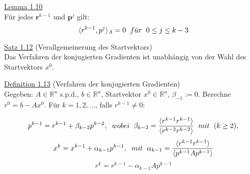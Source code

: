\documentclass[a4paper]{letter}
\begin{document}
\underline{Lemma 1.10}
\\F\"ur jedes $\textbf{r}^{k-1}$ und $\textbf{p}^{j}$ gilt:
$$\langle r^{k-1}, p^{j} \rangle _{A} = 0 \hspace{2mm} f\ddot{u}r \hspace{2mm} 0 \le j \le k-3$$

\underline{Satz 1.12} (Verallgemeinerung des Startvektors)
\\Das Verfahren der konjugierten Gradienten ist unabh\"angig von der Wahl des Startvektors $x^{0}$.

\underline{Definition 1.13} (Verfahren der konjugierten Gradienten)
\\Gegeben: $A \in \mathbb{R}^{n}$ s.p.d., $b \in \mathbb{R}^{n}$, Startvektor $x^{0} \in \mathbb{R}^{n}$, $\beta_{-1} := 0$. Berechne $r^{0} = b - Ax^{0}$. F\"ur $k = 1,2,...$, falls $r^{k-1} \ne 0$:
\begin{Large}
\emph{
	$$p^{k-1} = r^{k-1} + \beta_{k-2}p^{k-2}, \hspace{2mm} wobei \hspace{2mm} \beta_{k-2} = \frac {\langle r^{k-1} r^{k-1} \rangle} {\langle r^{k-2} r^{k-2} \rangle} \hspace{2mm} mit \hspace{2mm} (k \ge 2),$$
	$$x^{k} = x^{k-1} + \alpha_{k-1}p^{k-1}, \hspace{2mm} mit \hspace{2mm} \alpha_{k-1} = \frac {\langle r^{k-1} r^{k-1} \rangle} {\langle p^{k-1} Ap^{k-1} \rangle}$$
	$$r^{k} = r^{k-1} - \alpha_{k-1}Ap^{k-1}$$
}
\end{Large}
\end{document}

